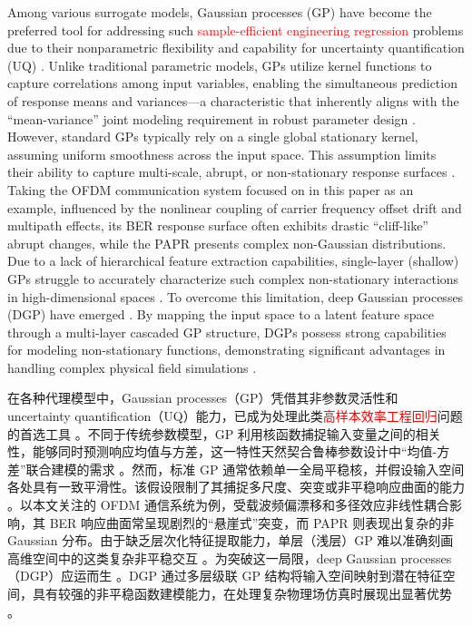 \documentclass[11pt]{article}
\begin{document}
Among various surrogate models, Gaussian processes (GP) have become the preferred tool for addressing such \textcolor{red}{sample-efficient engineering regression} problems due to their nonparametric flexibility and capability for uncertainty quantification (UQ) \citep{Williams2006, Deng2017, Joseph2019}. Unlike traditional parametric models, GPs utilize kernel functions to capture correlations among input variables, enabling the simultaneous prediction of response means and variances—a characteristic that inherently aligns with the ``mean-variance'' joint modeling requirement in robust parameter design \citep{Gramacy2020, Wang2025}. However, standard GPs typically rely on a single global stationary kernel, assuming uniform smoothness across the input space. This assumption limits their ability to capture multi-scale, abrupt, or non-stationary response surfaces \citep{Ko2022, Sauer2023, Tao2025}. Taking the OFDM communication system focused on in this paper as an example, influenced by the nonlinear coupling of carrier frequency offset drift and multipath effects, its BER response surface often exhibits drastic ``cliff-like'' abrupt changes, while the PAPR presents complex non-Gaussian distributions. Due to a lack of hierarchical feature extraction capabilities, single-layer (shallow) GPs struggle to accurately characterize such complex non-stationary interactions in high-dimensional spaces \citep{Zhai2022, Lin2024, WangX2025}. To overcome this limitation, deep Gaussian processes (DGP) have emerged \citep{Damianou2013}. By mapping the input space to a latent feature space through a multi-layer cascaded GP structure, DGPs possess strong capabilities for modeling non-stationary functions, demonstrating significant advantages in handling complex physical field simulations \citep{Muller2017, Ding2024}. 

在各种代理模型中，Gaussian processes（GP）凭借其非参数灵活性和 uncertainty quantification（UQ）能力，已成为处理此类\textcolor{red}{高样本效率工程回归}问题的首选工具 \citep{Williams2006, Deng2017, Joseph2019}。不同于传统参数模型，GP 利用核函数捕捉输入变量之间的相关性，能够同时预测响应均值与方差，这一特性天然契合鲁棒参数设计中“均值-方差”联合建模的需求 \citep{Gramacy2020, Wang2025}。然而，标准 GP 通常依赖单一全局平稳核，并假设输入空间各处具有一致平滑性。该假设限制了其捕捉多尺度、突变或非平稳响应曲面的能力 \citep{Ko2022, Sauer2023, Tao2025}。以本文关注的 OFDM 通信系统为例，受载波频偏漂移和多径效应非线性耦合影响，其 BER 响应曲面常呈现剧烈的“悬崖式”突变，而 PAPR 则表现出复杂的非 Gaussian 分布。由于缺乏层次化特征提取能力，单层（浅层）GP 难以准确刻画高维空间中的这类复杂非平稳交互 \citep{Zhai2022, Lin2024, WangX2025}。为突破这一局限，deep Gaussian processes（DGP）应运而生 \citep{Damianou2013}。DGP 通过多层级联 GP 结构将输入空间映射到潜在特征空间，具有较强的非平稳函数建模能力，在处理复杂物理场仿真时展现出显著优势 \citep{Muller2017, Ding2024}。
\end{document}
